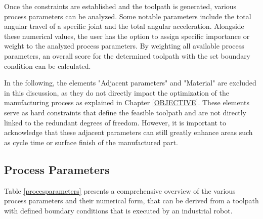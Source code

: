 Once the constraints are established and the toolpath is generated, various process parameters can be analyzed. Some notable parameters include the total angular travel of a specific joint and the total angular acceleration. Alongside these numerical values, the user has the option to assign specific importance or weight to the analyzed process parameters. By weighting all available process parameters, an overall score for the determined toolpath with the set boundary condition can be calculated.


In the following, the elements "Adjacent parameters" and "Material" are excluded in this discussion, as they do not directly impact the optimization of the manufacturing process as explained in Chapter \ref{OBJECTIVE}. These elements serve as hard constraints that define the feasible toolpath and are not directly linked to the redundant degrees of freedom. However, it is important to acknowledge that these adjacent parameters can still greatly enhance areas such as cycle time or surface finish of the manufactured part.



\subsection{Process Parameters}\label{pp}


Table \ref{procesparameters} presents a comprehensive overview of the various process parameters and their numerical form, that can be derived from a toolpath with defined boundary conditions that is executed by an industrial robot. 



